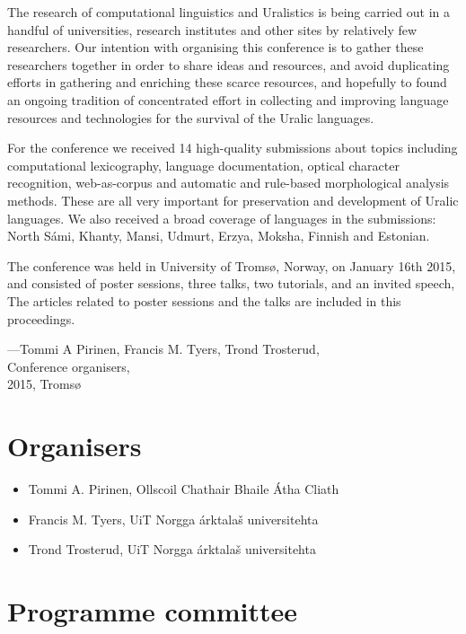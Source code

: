 \documentclass[b5paper]{book}
\begin{document}
The research of computational linguistics and Uralistics is being carried out
in a handful of universities, research institutes and other sites by
relatively few researchers. Our intention with organising this conference is to
gather these researchers together in order to share ideas and resources, and
avoid duplicating efforts in gathering and enriching these scarce resources,
and hopefully to found an ongoing tradition of concentrated effort in
collecting and improving language resources and technologies for the survival
of the Uralic languages.

For the conference we received 14 high-quality submissions about topics
including computational lexicography, language documentation, optical character
recognition, web-as-corpus and automatic and rule-based morphological analysis
methods.  These are all very important for preservation and development of
Uralic languages. We also received a broad coverage of languages in the
submissions: North Sámi, Khanty, Mansi, Udmurt, Erzya, Moksha, Finnish and
Estonian.

The conference was held in University of Tromsø, Norway, on January 16th 2015,
and consisted of poster sessions, three talks,
two tutorials, and an invited speech,
The articles related to poster sessions and the talks are included in this
proceedings.

\noindent ---Tommi A Pirinen, Francis M. Tyers, Trond Trosterud,\\
Conference organisers,\\
2015, Tromsø


\chapter*{Organisers}

\begin{itemize}
    \item Tommi A. Pirinen, Ollscoil Chathair Bhaile Átha Cliath
    \item Francis M. Tyers, UiT Norgga árktalaš universitehta
    \item Trond Trosterud, UiT Norgga árktalaš universitehta
\end{itemize}

\chapter*{Programme committee}
\end{document}
